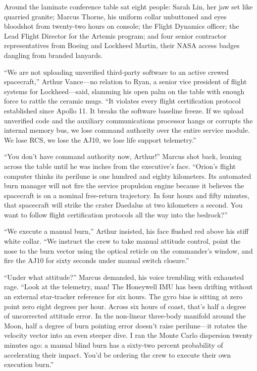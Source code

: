 \documentclass[12pt,twoside,openright]{book}
\begin{document}
Around the laminate conference table sat eight people: Sarah Lin, her
jaw set like quarried granite; Marcus Thorne, his uniform collar
unbuttoned and eyes bloodshot from twenty-two hours on console; the
Flight Dynamics officer; the Lead Flight Director for the Artemis
program; and four senior contractor representatives from Boeing and
Lockheed Martin, their NASA access badges dangling from branded
lanyards.

``We are not uploading unverified third-party software to an active
crewed spacecraft,'' Arthur Vance---no relation to Ryan, a senior vice
president of flight systems for Lockheed---said, slamming his open palm
on the table with enough force to rattle the ceramic mugs. ``It violates
every flight certification protocol established since Apollo 11. It
breaks the software baseline freeze. If we upload unverified code and
the auxiliary communications processor hangs or corrupts the internal
memory bus, we lose command authority over the entire service module. We
lose RCS, we lose the AJ10, we lose life support telemetry.''

``You don't have command authority now, Arthur!'' Marcus shot back,
leaning across the table until he was inches from the executive's face.
``Orion's flight computer thinks its perilune is one hundred and eighty
kilometers. Its automated burn manager will not fire the service
propulsion engine because it believes the spacecraft is on a nominal
free-return trajectory. In four hours and fifty minutes, that spacecraft
will strike the crater Daedalus at two kilometers a second. You want to
follow flight certification protocols all the way into the bedrock?''

``We execute a manual burn,'' Arthur insisted, his face flushed red
above his stiff white collar. ``We instruct the crew to take manual
attitude control, point the nose to the burn vector using the optical
reticle on the commander's window, and fire the AJ10 for sixty seconds
under manual switch closure.''

``Under what attitude?'' Marcus demanded, his voice trembling with
exhausted rage. ``Look at the telemetry, man! The Honeywell IMU has been
drifting without an external star-tracker reference for six hours. The
gyro bias is sitting at zero point zero eight degrees per hour. Across
six hours of coast, that's half a degree of uncorrected attitude error.
In the non-linear three-body manifold around the Moon, half a degree of
burn pointing error doesn't raise perilune---it rotates the velocity
vector into an even steeper dive. I ran the Monte Carlo dispersion
twenty minutes ago: a manual blind burn has a sixty-two percent
probability of accelerating their impact. You'd be ordering the crew to
execute their own execution burn.''
\end{document}
